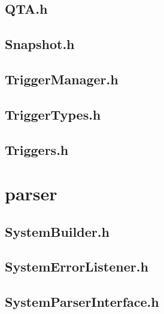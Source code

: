 \subsection{QTA.h}


\subsection{Snapshot.h}


\subsection{TriggerManager.h}


\subsection{TriggerTypes.h}


\subsection{Triggers.h}


\section{parser}

\subsection{SystemBuilder.h}


\subsection{SystemErrorListener.h}


\subsection{SystemParserInterface.h}


